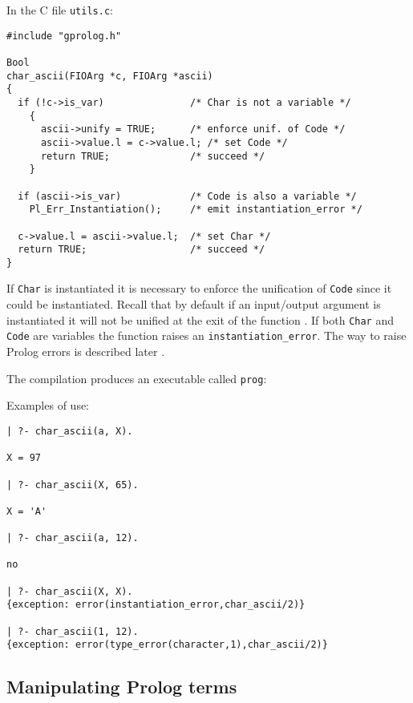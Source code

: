 In the C file \texttt{utils.c}:

\begin{Indentation}
\begin{verbatim}
#include "gprolog.h"

Bool
char_ascii(FIOArg *c, FIOArg *ascii)
{
  if (!c->is_var)               /* Char is not a variable */
    {
      ascii->unify = TRUE;      /* enforce unif. of Code */
      ascii->value.l = c->value.l; /* set Code */
      return TRUE;              /* succeed */
    }

  if (ascii->is_var)            /* Code is also a variable */
    Pl_Err_Instantiation();     /* emit instantiation_error */

  c->value.l = ascii->value.l;  /* set Char */
  return TRUE;                  /* succeed */
}
\end{verbatim}
\end{Indentation}

If \texttt{Char} is instantiated it is necessary to enforce the unification
of \texttt{Code} since it could be instantiated. Recall that by default if
an input/output argument is instantiated it will not be unified at the exit
of the function . If both \texttt{Char} and
\texttt{Code} are variables the function raises an
\texttt{instantiation\_error}. The way to raise Prolog errors is described
later .

The compilation produces an executable called \texttt{prog}:


Examples of use:

\begin{Indentation}
\begin{verbatim}
| ?- char_ascii(a, X).

X = 97

| ?- char_ascii(X, 65).

X = 'A'

| ?- char_ascii(a, 12).

no

| ?- char_ascii(X, X).
{exception: error(instantiation_error,char_ascii/2)}

| ?- char_ascii(1, 12).
{exception: error(type_error(character,1),char_ascii/2)}
\end{verbatim}
\end{Indentation}

\subsection{Manipulating Prolog terms}
\label{Manipulating-Prolog-terms}

